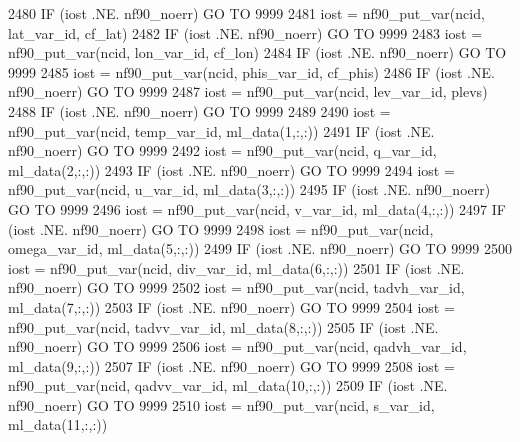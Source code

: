 \begin{DoxyCode}
{{{{{{2480     \textcolor{keywordflow}{IF} (iost .NE. nf90\_noerr) \textcolor{keywordflow}{GO TO} 9999
2481     iost    = nf90\_put\_var(ncid,    lat\_var\_id,         cf\_lat)
2482     \textcolor{keywordflow}{IF} (iost .NE. nf90\_noerr) \textcolor{keywordflow}{GO TO} 9999
2483     iost    = nf90\_put\_var(ncid,    lon\_var\_id,         cf\_lon)
2484     \textcolor{keywordflow}{IF} (iost .NE. nf90\_noerr) \textcolor{keywordflow}{GO TO} 9999
2485     iost    = nf90\_put\_var(ncid,    phis\_var\_id,        cf\_phis)
2486     \textcolor{keywordflow}{IF} (iost .NE. nf90\_noerr) \textcolor{keywordflow}{GO TO} 9999
2487     iost    = nf90\_put\_var(ncid,    lev\_var\_id,         plevs)
2488     \textcolor{keywordflow}{IF} (iost .NE. nf90\_noerr) \textcolor{keywordflow}{GO TO} 9999
2489 
2490     iost    = nf90\_put\_var(ncid,    temp\_var\_id,        ml\_data(1,:,:)) 
2491     \textcolor{keywordflow}{IF} (iost .NE. nf90\_noerr) \textcolor{keywordflow}{GO TO} 9999
2492     iost    = nf90\_put\_var(ncid,    q\_var\_id,           ml\_data(2,:,:))
2493     \textcolor{keywordflow}{IF} (iost .NE. nf90\_noerr) \textcolor{keywordflow}{GO TO} 9999
2494     iost    = nf90\_put\_var(ncid,    u\_var\_id,           ml\_data(3,:,:))
2495     \textcolor{keywordflow}{IF} (iost .NE. nf90\_noerr) \textcolor{keywordflow}{GO TO} 9999
2496     iost    = nf90\_put\_var(ncid,    v\_var\_id,           ml\_data(4,:,:))
2497     \textcolor{keywordflow}{IF} (iost .NE. nf90\_noerr) \textcolor{keywordflow}{GO TO} 9999
2498     iost    = nf90\_put\_var(ncid,    omega\_var\_id,       ml\_data(5,:,:))
2499     \textcolor{keywordflow}{IF} (iost .NE. nf90\_noerr) \textcolor{keywordflow}{GO TO} 9999
2500     iost    = nf90\_put\_var(ncid,    div\_var\_id,         ml\_data(6,:,:))
2501     \textcolor{keywordflow}{IF} (iost .NE. nf90\_noerr) \textcolor{keywordflow}{GO TO} 9999
2502     iost    = nf90\_put\_var(ncid,    tadvh\_var\_id,       ml\_data(7,:,:))
2503     \textcolor{keywordflow}{IF} (iost .NE. nf90\_noerr) \textcolor{keywordflow}{GO TO} 9999
2504     iost    = nf90\_put\_var(ncid,    tadvv\_var\_id,       ml\_data(8,:,:))
2505     \textcolor{keywordflow}{IF} (iost .NE. nf90\_noerr) \textcolor{keywordflow}{GO TO} 9999
2506     iost    = nf90\_put\_var(ncid,    qadvh\_var\_id,       ml\_data(9,:,:))
2507     \textcolor{keywordflow}{IF} (iost .NE. nf90\_noerr) \textcolor{keywordflow}{GO TO} 9999
2508     iost    = nf90\_put\_var(ncid,    qadvv\_var\_id,       ml\_data(10,:,:))
2509     \textcolor{keywordflow}{IF} (iost .NE. nf90\_noerr) \textcolor{keywordflow}{GO TO} 9999
2510     iost    = nf90\_put\_var(ncid,    s\_var\_id,           ml\_data(11,:,:))
}}}}}}
\end{DoxyCode}
